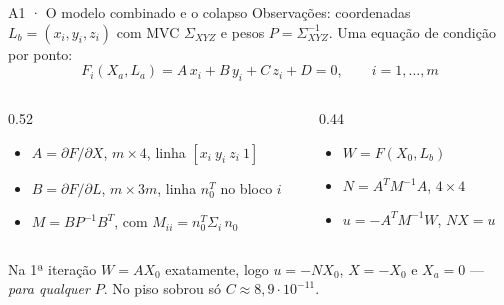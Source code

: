 \documentclass[aspectratio=169,11pt]{beamer}
\begin{document}
\begin{frame}{A1 · O modelo combinado e o colapso}
  \small
  Observações: coordenadas $L_b = (x_i, y_i, z_i)$ com MVC $\Sigma_{XYZ}$ e pesos
  $P = \Sigma_{XYZ}^{-1}$. Uma equação de condição por ponto:
  \[ F_i(X_a, L_a) = A\,x_i + B\,y_i + C\,z_i + D = 0, \qquad i = 1, \dots, m \]
  \vspace{-4pt}
  \begin{columns}[T]
    \begin{column}{0.52\textwidth}
      \begin{itemize}
        \item $A = \partial F/\partial X$, $m\times4$, linha $[x_i\ y_i\ z_i\ 1]$
        \item $B = \partial F/\partial L$, $m\times3m$, linha $n_0^T$ no bloco $i$
        \item $M = B P^{-1} B^T$, com $M_{ii} = n_0^T \Sigma_i\, n_0$
      \end{itemize}
    \end{column}
    \begin{column}{0.44\textwidth}
      \begin{itemize}
        \item $W = F(X_0, L_b)$
        \item $N = A^T M^{-1} A$, \;$4\times4$
        \item $u = -A^T M^{-1} W$, \;$N X = u$
      \end{itemize}
    \end{column}
  \end{columns}
  \medskip
  \begin{armadilha}[title={O colapso}]
    Na 1ª iteração $W = A X_0$ exatamente, logo $u = -N X_0$, $X = -X_0$ e $X_a = 0$
    --- \emph{para qualquer} $P$. No piso sobrou só $C \approx 8{,}9\cdot10^{-11}$.
  \end{armadilha}
\end{frame}
\end{document}

